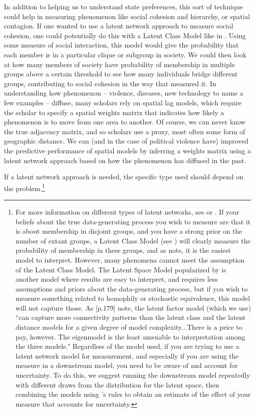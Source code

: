 In addition to helping us to understand state preferences, this sort of technique could help in measuring phenomenon like social cohesion and hierarchy, or spatial contagion. If one wanted to use a latent network approach to measure social cohesion, one could potentially do this with a Latent Class Model like in \citet{airoldi:etal:2008}. Using some measure of social interaction, this model would give the probability that each member is in a particular clique or subgroup in society. We could then look at how many members of society have probability of membership in multiple groups above a certain threshold to see how many individuals bridge different groups, contributing to social cohesion in the way that \citet{moody:white:2003} measured it. In understanding how phenomenon -- violence, diseases, new technology to name a few examples -- diffuse, many scholars rely on spatial lag models, which require the scholar to specify a spatial weights matrix that indicates how likely a phenomenon is to move from one area to another. Of course, we can never know the true adjacency matrix, and so scholars use a proxy, most often some form of geographic distance. We can (and in the case of political violence have) improved the predictive performance of spatial models by inferring a weights matrix using a latent network approach based on how the phenomenon has diffused in the past. 

If a latent network approach is needed, the specific type used should depend on the problem.\footnote{For more information on different types of latent networks, see \citet{minhas:etal:2019} or \citet{goldenberg:etal:2010}. If your beliefs about the true data-generating process you wish to measure are that it is about membership in disjoint groups, and you have a strong prior on the number of extant groups, a Latent Class Model (see \citet{airoldi:etal:2008}) will  clearly measure the probability of membership in these groups, and as \citet{goldenberg:etal:2010} note, it is the easiest model to interpret. However, many phenomena cannot meet the assumption of the Latent Class Model. The Latent Space Model popularized by \citet{handcock:etal:2008} is another model where results are easy to interpret, and requires less assumptions and priors about the data-generating process, but if you wish to measure something related to homophily or stochastic equivalence, this model will not capture those.  As \citet{goldenberg:etal:2010}[p.179] note, the latent factor model (which we use) ``can capture more connectivity patterns than the latent class and the latent distance models for a given degree of model complexity...There is a price to pay, however. The eigenmodel is the least amenable to interpretation among the three models." Regardless of the model used, if you are trying to use a latent network model for measurement, and especially if you are using the measure in a downstream model, you need to be aware of and account for uncertainty. To do this, we suggest running the downstream model repeatedly with different draws from the distribution for the latent space, then combining the models using \citet{rubin:1976}'s rules to obtain an estimate of the effect of your measure that accounts for uncertainty.}

